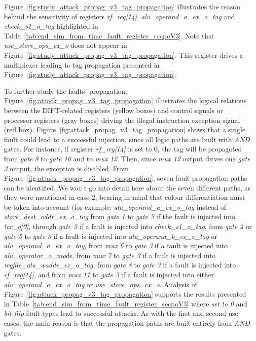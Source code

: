Figure~\ref{fig:study_attack_propag_v3_tag_propagation} illustrates the reason behind the sensitivity of registers \textit{rf\_reg[14]}, \textit{alu\_operand\_a\_ex\_o\_tag} and \textit{check\_s1\_o\_tag} highlighted in Table~\ref{tab:end_sim_from_time_fault_register_secpoV3}.
Note that \textit{use\_store\_ops\_ex\_o} does not appear in Figure~\ref{fig:study_attack_propag_v3_tag_propagation}. This register drives a multiplexer leading to tag propagation presented in Figure~\ref{fig:study_attack_propag_v3_tag_propagation}.

To further study the faults' propagation, Figure~\ref{fig:attack_propag_v3_tag_propagation} illustrates the logical relations between the DIFT-related registers (yellow boxes) and control signals or processor registers (gray boxes) driving the illegal instruction exception signal (red box).
Figure~\ref{fig:attack_propag_v3_tag_propagation} shows that a single fault could lead to a successful injection, since all logic paths are built with \textit{AND} gates. For instance, if register \textit{rf\_reg[14]} is set to 0, the tag will be propagated from \textit{gate 8} to \textit{gate 10} and to \textit{mux 12}. Then, since \textit{mux 12} output drives one \textit{gate 3} output, the exception is disabled.
From Figure~\ref{fig:attack_propag_v3_tag_propagation}, seven fault propagation paths can be identified. We won't go into detail here about the seven different paths, as they were mentioned in case 2, bearing in mind that colour differentiation must be taken into account (for example: \textit{alu\_operand\_a\_ex\_o\_tag} instead of \textit{store\_dest\_addr\_ex\_o\_tag}
from \textit{gate 1} to \textit{gate 3} if the fault is injected into \textit{tcr\_q[0]},
through \textit{gate 3} if a fault is injected into \textit{check\_s1\_o\_tag},
from \textit{gate 4} or \textit{gate 5} to \textit{gate 3} if a fault is injected into \textit{alu\_operand\_b\_ex\_o\_tag} or \textit{alu\_operand\_a\_ex\_o\_tag},
from \textit{mux 6} to \textit{gate 3} if a fault is injected into \textit{alu\_operator\_o\_mode},
from \textit{mux 7} to \textit{gate 3} if a fault is injected into \textit{regfile\_alu\_waddr\_ex\_o\_tag}, from \textit{gate 8} to \textit{gate 3} if a fault is injected into \textit{rf\_reg[14]}, and
from \textit{mux 11} to \textit{gate 3} if a fault is injected into either \textit{alu\_operand\_a\_ex\_o\_tag} or \textit{use\_store\_ops\_ex\_o}.
Analysis of Figure~\ref{fig:attack_propag_v3_tag_propagation} supports the results presented in Table~\ref{tab:end_sim_from_time_fault_register_secpoV3} where \textit{set to 0} and \textit{bit-flip} fault types lead to successful attacks. As with the first and second use cases, the main reason is that the propagation paths are built entirely from \textit{AND} gates.

